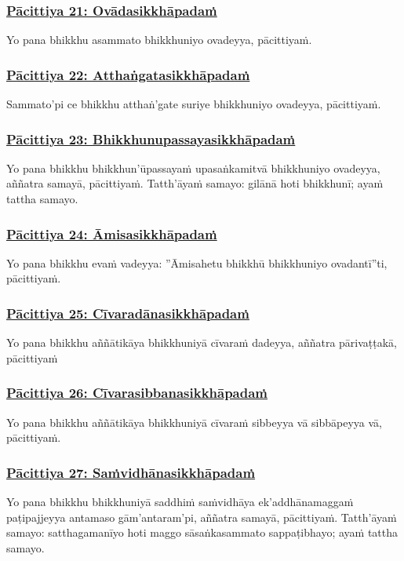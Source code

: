\subsubsection*{\hyperref[exp]{Pācittiya 21: Ovādasikkhāpadaṁ}}
\label{pac21}

Yo pana bhikkhu asammato bhikkhuniyo ovadeyya, pācittiyaṁ.

\subsubsection*{\hyperref[exp22]{Pācittiya 22: Atthaṅgatasikkhāpadaṁ}}
\label{pac22}
Sammato'pi ce bhikkhu atthaṅ'gate suriye bhikkhuniyo ovadeyya, pācittiyaṁ.

\subsubsection*{\hyperref[exp23]{Pācittiya 23: Bhikkhunupassayasikkhāpadaṁ}}
\label{pac23}
Yo pana bhikkhu bhikkhun'ūpassayaṁ upasaṅkamitvā bhikkhuniyo ovadeyya, aññatra samayā, pācittiyaṁ. Tatth'āyaṁ samayo: gilānā hoti bhikkhunī; ayaṁ tattha samayo.

\subsubsection*{\hyperref[exp24]{Pācittiya 24: Āmisasikkhāpadaṁ}}
\label{pac24}
Yo pana bhikkhu evaṁ vadeyya: ''Āmisahetu bhikkhū bhikkhuniyo ovadantī''ti, pācittiyaṁ.

\subsubsection*{\hyperref[exp25]{Pācittiya 25: Cīvaradānasikkhāpadaṁ}}
\label{pac25}
Yo pana bhikkhu aññātikāya bhikkhuniyā cīvaraṁ dadeyya, aññatra pārivaṭṭakā, pācittiyaṁ

\subsubsection*{\hyperref[exp26]{Pācittiya 26: Cīvarasibbanasikkhāpadaṁ}}
\label{pac26}
Yo pana bhikkhu aññātikāya bhikkhuniyā cīvaraṁ sibbeyya vā sibbāpeyya vā, pācittiyaṁ.

\subsubsection*{\hyperref[exp27]{Pācittiya 27: Saṁvidhānasikkhāpadaṁ}}
\label{pac27}
Yo pana bhikkhu bhikkhuniyā saddhiṁ saṁvidhāya ek'addhānamaggaṁ paṭipajjeyya antamaso gām'antaram'pi, aññatra samayā, pācittiyaṁ. Tatth'āyaṁ samayo: satthagamanīyo hoti maggo sāsaṅkasammato sappaṭibhayo; ayaṁ tattha samayo.

